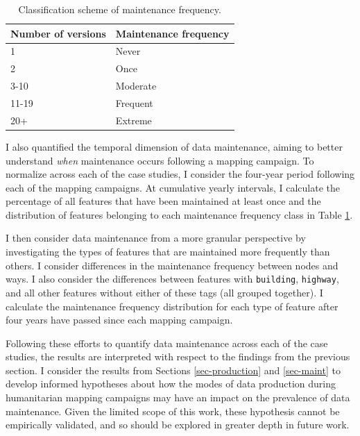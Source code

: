 \begin{table}[]
\centering
\caption{Classification scheme of maintenance frequency.}
\label{tab:freq}
\begin{tabular}{ll}
\toprule
Number of versions & Maintenance frequency \\
\midrule
1                  & Never                  \\
2                  & Once                  \\
3-10               & Moderate              \\
11-19              & Frequent              \\
20+                & Extreme               \\
\bottomrule
\end{tabular}
\end{table}

I also quantified the temporal dimension of data maintenance, aiming to better understand \textit{when} maintenance occurs following a mapping campaign. To normalize across each of the case studies, I consider the four-year period following each of the mapping campaigns. At cumulative yearly intervals, I calculate the percentage of all features that have been maintained at least once and the distribution of features belonging to each maintenance frequency class in Table \ref{tab:freq}. 

I then consider data maintenance from a more granular perspective by investigating the types of features that are maintained more frequently than others. I consider differences in the maintenance frequency between nodes and ways. I also consider the differences between features with \texttt{building}, \texttt{highway}, and all other features without either of these tags (all grouped together). I calculate the maintenance frequency distribution for each type of feature after four years have passed since each mapping campaign. 

Following these efforts to quantify data maintenance across each of the case studies, the results are interpreted with respect to the findings from the previous section. I consider the results from Sections \ref{sec-production} and \ref{sec-maint} to develop informed hypotheses about how the modes of data production during humanitarian mapping campaigns may have an impact on the prevalence of data maintenance. Given the limited scope of this work, these hypothesis cannot be empirically validated, and so should be explored in greater depth in future work. 

